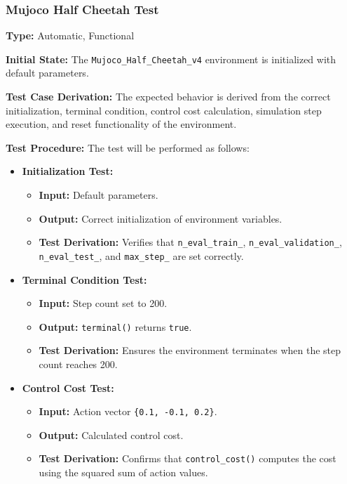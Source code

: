 \documentclass[12pt, titlepage]{article}
\begin{document}
\subsubsection{Mujoco Half Cheetah Test\\}

\textbf{Type:} Automatic, Functional

\textbf{Initial State:} The \texttt{Mujoco\_Half\_Cheetah\_v4} environment is initialized with default parameters.

\textbf{Test Case Derivation:} The expected behavior is derived from the correct initialization, terminal condition, control cost calculation, simulation step execution, and reset functionality of the environment.

\textbf{Test Procedure:} The test will be performed as follows:
\begin{itemize}
    \item \textbf{Initialization Test:}
    \begin{itemize}
        \item \textbf{Input:} Default parameters.
        \item \textbf{Output:} Correct initialization of environment variables.
        \item \textbf{Test Derivation:} Verifies that \texttt{n\_eval\_train\_}, \texttt{n\_eval\_validation\_}, \texttt{n\_eval\_test\_}, and \texttt{max\_step\_} are set correctly.
    \end{itemize}

    \item \textbf{Terminal Condition Test:}
    \begin{itemize}
        \item \textbf{Input:} Step count set to 200.
        \item \textbf{Output:} \texttt{terminal()} returns \texttt{true}.
        \item \textbf{Test Derivation:} Ensures the environment terminates when the step count reaches 200.
    \end{itemize}

    \item \textbf{Control Cost Test:}
    \begin{itemize}
        \item \textbf{Input:} Action vector \texttt{\{0.1, -0.1, 0.2\}}.
        \item \textbf{Output:} Calculated control cost.
        \item \textbf{Test Derivation:} Confirms that \texttt{control\_cost()} computes the cost using the squared sum of action values.
    \end{itemize}


\end{itemize}
\end{document}

